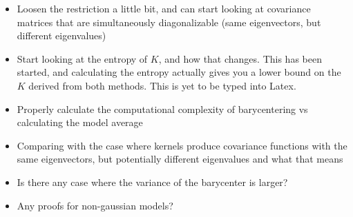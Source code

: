\documentclass[12pt]{article}
\begin{document}
\begin{todo}

    \begin{itemize}
        \item Loosen the restriction a little bit, and can start looking at covariance matrices that are simultaneously diagonalizable
        (same eigenvectors, but different eigenvalues)

        \item Start looking at the entropy of $K$, and how that changes. This has been started, and calculating the entropy actually
        gives you a lower bound on the $K$ derived from both methods. This is yet to be typed into Latex.

        \item Properly calculate the computational complexity of barycentering vs
                calculating the model average

        \item Comparing with the case where kernels produce covariance functions with the same eigenvectors,
                but potentially different eigenvalues and what that means

        \item Is there any case where the variance of the barycenter is larger?

        \item Any proofs for non-gaussian models?
    \end{itemize}

\end{todo}


%


\appendix


\printbibliography
\end{document}
